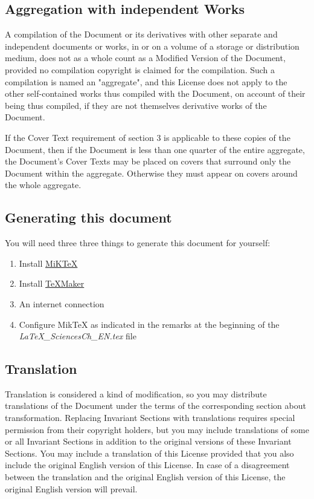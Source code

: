 	\subsection{Aggregation with independent Works} 
	A compilation of the Document or its derivatives with other separate and independent documents or works, in or on a volume of a storage or distribution medium, does not as a whole count as a Modified Version of the Document, provided no compilation copyright is claimed for the compilation. Such a compilation is named an "aggregate", and this License does not apply to the other self-contained works thus compiled with the Document, on account of their being thus compiled, if they are not themselves derivative works of the Document. 

	If the Cover Text requirement of section 3 is applicable to these copies of the Document, then if the Document is less than one quarter of the entire aggregate, the Document's Cover Texts may be placed on covers that surround only the Document within the aggregate. Otherwise they must appear on covers around the whole aggregate. 
	
	\subsection{Generating this document}
	You will need three three things to generate this document for yourself:
	\begin{enumerate}
		\item Install \href{https://miktex.org/}{MiKTeX}

		\item Install \href{http://www.xm1math.net/texmaker/index_fr.html}{TeXMaker}

		\item An internet connection

		\item Configure MikTeX as indicated in the remarks at the beginning of the \textit{LaTeX\_SciencesCh\_EN.tex} file
	\end{enumerate}

	\subsection{Translation}
	Translation is considered a kind of modification, so you may distribute translations of the Document under the terms of the corresponding section about transformation. Replacing Invariant Sections with translations requires special permission from their copyright holders, but you may include translations of some or all Invariant Sections in addition to the original versions of these Invariant Sections. You may include a translation of this License provided that you also include the original English version of this License. In case of a disagreement between the translation and the original English version of this License, the original English version will prevail. 

